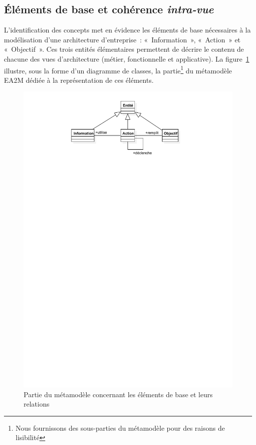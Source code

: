     \subsection{Éléments de base et cohérence \emph{intra-vue}}
    \label{sec:intravue}

    L'identification des concepts met en évidence les éléments de base nécessaires à la modélisation d'une
    architecture d'entreprise~: «~Information~», «~Action~» et «~Objectif~». Ces trois entités élémentaires permettent de décrire
    le contenu de chacune des vues d’architecture (métier, fonctionnelle et applicative).
    La figure~\ref{fig:core_concepts} illustre, sous la forme d'un diagramme de 
    classes, la partie\footnote{Nous fournissons des sous-parties du métamodèle pour des raisons de
    lisibilité} du métamodèle EA2M dédiée à la représentation de ces éléments.

    \begin{figure}[!ht]
    \begin{center}
    \includegraphics[trim= 0cm 23cm 0cm 0cm, width=1\textwidth]{figures/4_demarche/core_concepts.pdf}
    \end{center}
    \caption{Partie du métamodèle concernant les éléments de base et leurs relations} 
    \label{fig:core_concepts}
    \end{figure}

